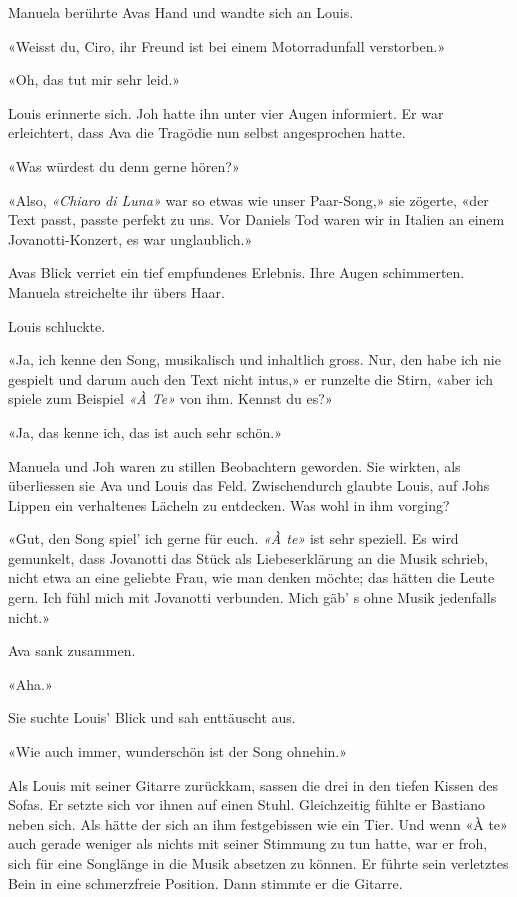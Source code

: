 Manuela berührte Avas Hand und wandte sich an Louis.

«Weisst du, Ciro, ihr Freund ist bei einem Motorradunfall verstorben.»

«Oh, das tut mir sehr leid.»

Louis erinnerte sich. Joh hatte ihn unter vier Augen informiert. Er
war erleichtert, dass Ava die Tragödie nun selbst angesprochen hatte.

«Was würdest du denn gerne hören?»

«Also, \emph{«Chiaro di Luna»} war so etwas wie unser Paar-Song,» sie
zögerte, «der Text passt, passte perfekt zu uns. Vor Daniels Tod waren wir in Italien an
einem Jovanotti-Konzert, es war unglaublich.»

Avas Blick verriet ein tief empfundenes Erlebnis. Ihre Augen schimmerten. Manuela streichelte ihr übers Haar.


Louis schluckte.

«Ja, ich kenne den Song, musikalisch und inhaltlich gross. Nur, den habe
ich nie gespielt und darum auch den Text nicht intus,» er runzelte
die Stirn, «aber ich spiele zum Beispiel \emph{«À Te»} von ihm. Kennst
du es?»

«Ja, das kenne ich, das ist auch sehr schön.»

Manuela und Joh waren zu stillen Beobachtern geworden. Sie wirkten, als überliessen
sie Ava und Louis das Feld. Zwischendurch glaubte Louis, auf Johs Lippen
ein verhaltenes Lächeln zu entdecken. Was wohl in ihm vorging?

«Gut, den Song spiel’ ich gerne für euch. \emph{«À te»} ist sehr speziell. Es wird gemunkelt, 
dass Jovanotti das Stück als Liebeserklärung an die Musik schrieb, nicht etwa an eine geliebte Frau,
wie man denken möchte; das hätten die Leute gern. Ich fühl mich mit
Jovanotti verbunden. Mich gäb’ s ohne Musik jedenfalls nicht.»

Ava sank zusammen.

«Aha.»

Sie suchte Louis’ Blick und sah enttäuscht aus. 

«Wie auch immer, wunderschön ist der Song ohnehin.»

Als Louis mit seiner Gitarre zurückkam, sassen die drei in den
tiefen Kissen des Sofas. Er setzte sich vor ihnen auf einen Stuhl.
Gleichzeitig fühlte er Bastiano neben sich. Als hätte der sich an ihm
festgebissen wie ein Tier. Und wenn «À te» auch gerade
weniger als nichts mit seiner Stimmung zu tun hatte, war er froh, sich für eine Songlänge in die Musik absetzen zu können. Er führte sein verletztes Bein in eine schmerzfreie Position. Dann
stimmte er die Gitarre. 

